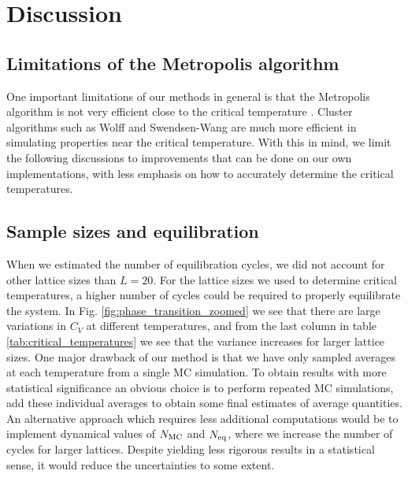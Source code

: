 \section{Discussion}\label{sec:discussion}
\subsection{Limitations of the Metropolis algorithm}\label{subsec_discussion:limitations}
One important limitations of our methods in general is that the Metropolis algorithm is not very efficient close to the critical temperature \cite{lecture_notes}. Cluster algorithms such as Wolff and Swendsen-Wang are much more efficient in simulating properties near the critical temperature. With this in mind, we limit the following discussions to improvements that can be done on our own implementations, with less emphasis on how to accurately determine the critical temperatures. 

\subsection{Sample sizes and equilibration}\label{subsec_discussion:sample_size_equi}
When we estimated the number of equilibration cycles, we did not account for other lattice sizes than $L=20$. For the lattice sizes we used to determine critical temperatures, a higher number of cycles could be required to properly equilibrate the system. In Fig. \ref{fig:phase_transition_zoomed} we see that there are large variations in $C_V$ at different temperatures, and from the last column in table \ref{tab:critical_temperatures} we see that the variance increases for larger lattice sizes. One major drawback of our method is that we have only sampled averages at each temperature from a single MC simulation. To obtain results with more statistical significance an obvious choice is to perform repeated MC simulations, add these individual averages to obtain some final estimates of average quantities. An alternative approach which requires less additional computations would be to implement dynamical values of $N_\mathrm{MC}$ and $N_\mathrm{eq}$, where we increase the number of cycles for larger lattices. Despite yielding less rigorous results in a statistical sense, it would reduce the uncertainties to some extent.  


